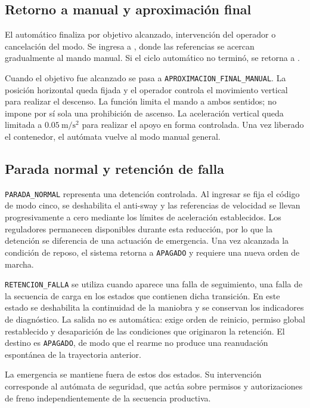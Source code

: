 \documentclass[a4paper,10pt,onecolumn,journal]{ieeeconf}
\numberwithin{equation}{section}
\begin{document}

\subsection{Retorno a manual y aproximación final}
El automático finaliza por objetivo alcanzado, intervención del operador o cancelación del modo. Se ingresa a , donde las referencias se acercan gradualmente al mando manual. Si el ciclo automático no terminó, se retorna a .

Cuando el objetivo fue alcanzado se pasa a \texttt{APROXIMACION\_FINAL\_MANUAL}. La posición horizontal queda fijada y el operador controla el movimiento vertical para realizar el descenso. La función limita el mando a ambos sentidos; no impone por sí sola una prohibición de ascenso. La aceleración vertical queda limitada a $0.05~\mathrm{m/s^2}$ para realizar el apoyo en forma controlada. Una vez liberado el contenedor, el autómata vuelve al modo manual general.


\subsection{Parada normal y retención de falla}
\texttt{PARADA\_NORMAL} representa una detención controlada. Al ingresar se fija el código de modo cinco, se deshabilita el anti-sway y las referencias de velocidad se llevan progresivamente a cero mediante los límites de aceleración establecidos. Los reguladores permanecen disponibles durante esta reducción, por lo que la detención se diferencia de una actuación de emergencia. Una vez alcanzada la condición de reposo, el sistema retorna a \texttt{APAGADO} y requiere una nueva orden de marcha.

\texttt{RETENCION\_FALLA} se utiliza cuando aparece una falla de seguimiento, una falla de la secuencia de carga en los estados que contienen dicha transición. En este estado se deshabilita la continuidad de la maniobra y se conservan los indicadores de diagnóstico. La salida no es automática: exige orden de reinicio, permiso global restablecido y desaparición de las condiciones que originaron la retención. El destino es \texttt{APAGADO}, de modo que el rearme no produce una reanudación espontánea de la trayectoria anterior.

La emergencia se mantiene fuera de estos dos estados. Su intervención corresponde al autómata de seguridad, que actúa sobre permisos y autorizaciones de freno independientemente de la secuencia productiva.
\end{document}
